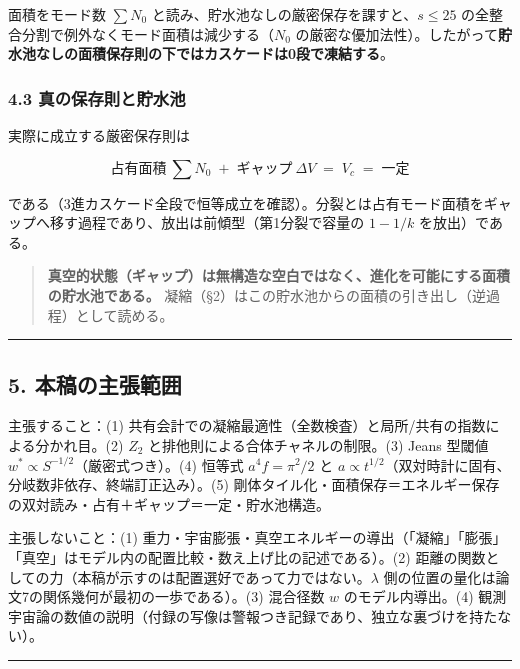 \documentclass[
]{ltjsarticle}
\begin{document}
面積をモード数 \(\sum N_0\)
と読み、貯水池なしの厳密保存を課すと、\(s\le25\)
の全整合分割で例外なくモード面積は減少する（\(N_0\)
の厳密な優加法性）。したがって\textbf{貯水池なしの面積保存則の下ではカスケードは0段で凍結する}。

\subsubsection{4.3
真の保存則と貯水池}\label{ux771fux306eux4fddux5b58ux5247ux3068ux8cafux6c34ux6c60}

実際に成立する厳密保存則は

\[
\text{占有面積}\ \textstyle\sum N_0\;+\;\text{ギャップ}\ \Delta V\;=\;V_c\;=\;\text{一定}
\]

である（3進カスケード全段で恒等成立を確認）。分裂とは占有モード面積をギャップへ移す過程であり、放出は前傾型（第1分裂で容量の
\(1-1/k\) を放出）である。

\begin{quote}
\textbf{真空的状態（ギャップ）は無構造な空白ではなく、進化を可能にする面積の貯水池である。}
凝縮（§2）はこの貯水池からの面積の引き出し（逆過程）として読める。
\end{quote}

\begin{center}\rule{0.5\linewidth}{0.5pt}\end{center}

\subsection{5.
本稿の主張範囲}\label{ux672cux7a3fux306eux4e3bux5f35ux7bc4ux56f2}

主張すること：(1)
共有会計での凝縮最適性（全数検査）と局所/共有の指数による分かれ目。(2)
\(Z_2\) と排他則による合体チャネルの制限。(3) Jeans 型閾値
\(w^*\propto S^{-1/2}\)（厳密式つき）。(4) 恒等式 \(a^4f=\pi^2/2\) と
\(a\propto t^{1/2}\)（双対時計に固有、分岐数非依存、終端訂正込み）。(5)
剛体タイル化・面積保存＝エネルギー保存の双対読み・占有＋ギャップ＝一定・貯水池構造。

主張しないこと：(1)
重力・宇宙膨張・真空エネルギーの導出（「凝縮」「膨張」「真空」はモデル内の配置比較・数え上げ比の記述である）。(2)
距離の関数としての力（本稿が示すのは配置選好であって力ではない。\(\lambda\)
側の位置の量化は論文7の関係幾何が最初の一歩である）。(3) 混合径数 \(w\)
のモデル内導出。(4)
観測宇宙論の数値の説明（付録の写像は警報つき記録であり、独立な裏づけを持たない）。

\begin{center}\rule{0.5\linewidth}{0.5pt}\end{center}
\end{document}
